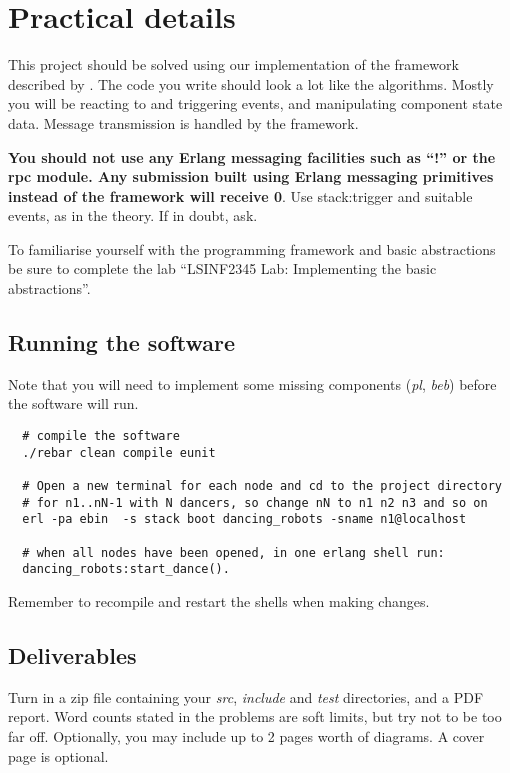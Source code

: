 \documentclass[a4paper]{article}
\begin{document}
\section*{Practical details} %
\label{sec:practical_details}

This project should be solved using our implementation of the framework
described by \cite{cachin2011}. The code you write should look a lot like the
algorithms. Mostly you will be reacting to and triggering events, and
manipulating component state data. Message transmission is handled by the
framework.

\textbf{You should not use any Erlang messaging facilities such as ``!'' or the rpc
module. Any submission built using Erlang messaging primitives
instead of the framework will receive 0}. Use stack:trigger
and suitable events, as in the theory. If in doubt, ask.

To familiarise yourself with the programming framework and basic abstractions
be sure to complete the lab ``LSINF2345 Lab: Implementing the basic
abstractions''.

\subsection*{Running the software} %
\label{sub:running_the_software}

Note that you will need to implement some missing components (\emph{pl},
\emph{beb}) before the software will run.

\begin{verbatim}
  # compile the software
  ./rebar clean compile eunit

  # Open a new terminal for each node and cd to the project directory
  # for n1..nN-1 with N dancers, so change nN to n1 n2 n3 and so on
  erl -pa ebin  -s stack boot dancing_robots -sname n1@localhost

  # when all nodes have been opened, in one erlang shell run:
  dancing_robots:start_dance().
\end{verbatim}

Remember to recompile and restart the shells when making changes.


\subsection*{Deliverables} %
\label{sub:deliverables}

Turn in a zip file containing your \emph{src}, \emph{include} and \emph{test}
directories, and a PDF report. Word counts stated in the problems are soft
limits, but try not to be too far off. Optionally, you may include up to 2
pages worth of diagrams. A cover page is optional.
\end{document}
